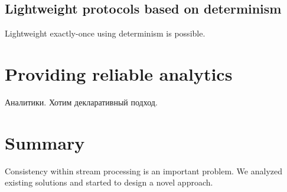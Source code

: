 \documentclass{llncs}
\begin{document}
\subsection{Lightweight protocols based on determinism}
Lightweight exactly-once using determinism is possible. 

\section{Providing reliable analytics}
Аналитики. Хотим декларативный подход.

\section {Summary}
Consistency within stream processing is an important problem. We analyzed existing solutions and started to design a novel approach.



\end{document}
